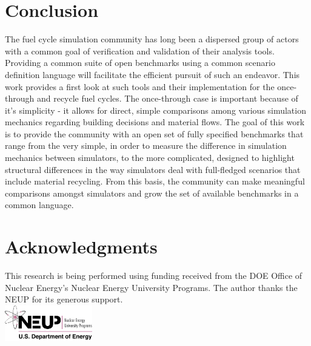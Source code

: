 \documentclass{anstrans}
\begin{document}
\section{Conclusion}
The fuel cycle simulation community has long been a dispersed group of actors
with a common goal of verification and validation of their analysis
tools. Providing a common suite of open benchmarks using a common scenario
definition language will facilitate the efficient pursuit of such an
endeavor. This work provides a first look at such tools and their implementation
for the once-through and recycle fuel cycles. The once-through case is important
because of it's simplicity - it allows for direct, simple comparisons among
various simulation mechanics regarding building decisions and material
flows. The goal of this work is to provide the community with an open set of
fully specified benchmarks that range from the very simple, in order to measure
the difference in simulation mechanics between simulators, to the more
complicated, designed to highlight structural differences in the way simulators
deal with full-fledged scenarios that include material recycling. From this
basis, the community can make meaningful comparisons amongst simulators and grow
the set of available benchmarks in a common language.

\section{Acknowledgments}
This research is being performed using funding received from the DOE Office of
Nuclear Energy's Nuclear Energy University Programs.  The author thanks the NEUP
for its generous support.\\ 
\includegraphics[width=1.5in]{neup_logo_large.jpg}


\end{document}
